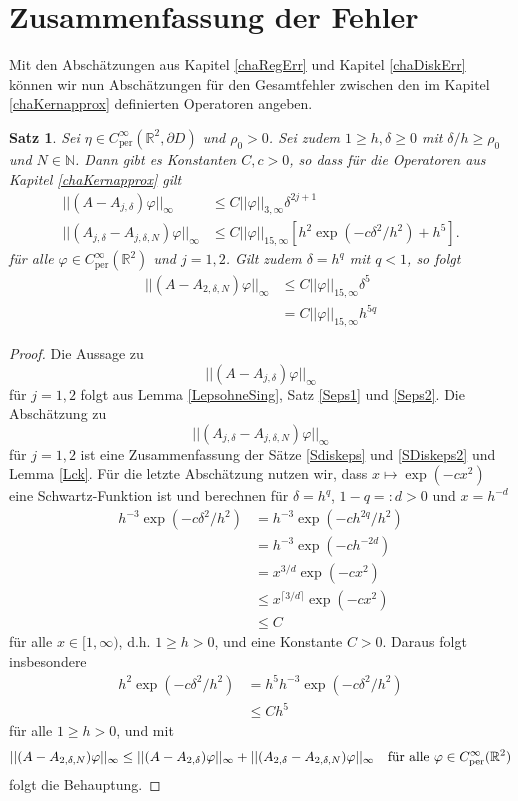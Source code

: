 \documentclass[12pt,a4paper]{scrartcl}
\newtheorem{Satz}{Satz}[section]
\numberwithin{equation}{section}
\newcommand{\R}{\mathbb{R}} %
\newcommand{\N}{\mathbb{N}} %
\newcommand{\per}{\operatorname{per}}
\newcommand{\fa}{\text{\quad für alle }}
\begin{document}
\section{Zusammenfassung der Fehler}
Mit den Abschätzungen aus Kapitel \ref{chaRegErr} und Kapitel \ref{chaDiskErr} können wir nun Abschätzungen für den Gesamtfehler zwischen den im Kapitel \ref{chaKernapprox} definierten Operatoren angeben. 
\begin{Satz}
Sei $\eta \in C_{\per}^{\infty}(\R^2,\partial D)$ und $\rho_0>0$. Sei zudem $1 \geq h,\delta \geq 0$ mit $\delta/h \geq \rho_0$ und $N \in \N$. Dann gibt es Konstanten $C,c>0$, so dass für die Operatoren aus Kapitel \ref{chaKernapprox} gilt
\begin{align*}
||(A-A_{j,\delta})\varphi||_{\infty}  &\leq C ||\varphi||_{3,\infty} \delta^{2j+1} \\
||(A_{j,\delta} - A_{j,\delta,N})\varphi||_{\infty} &\leq C||\varphi||_{15,\infty} [h^2 \exp(-c \delta^2/h^2)+h^5].
\end{align*}
für alle $\varphi \in C_{\per}^\infty(\R^2)$ und $j=1,2$. Gilt zudem $\delta = h^q$ mit $q<1$, so folgt
\begin{align*}
||(A-A_{2,\delta,N}) \varphi||_\infty &\leq C ||\varphi||_{15,\infty} \delta^5 \\
 &= C ||\varphi||_{15,\infty} h^{5q} 
\end{align*}
\end{Satz}
\begin{proof}
Die Aussage zu
\[
||(A-A_{j,\delta})\varphi||_{\infty} 
\]
für $j=1,2$ folgt aus Lemma \ref{LepsohneSing}, Satz \ref{Seps1} und \ref{Seps2}.
Die Abschätzung zu
\[
||(A_{j,\delta} - A_{j,\delta,N})\varphi||_{\infty}
\]
für $j=1,2$ ist eine Zusammenfassung der Sätze \ref{Sdiskeps} und \ref{SDiskeps2} und Lemma \ref{Lck}.
Für die letzte Abschätzung nutzen wir, dass $x \mapsto \exp(-c x^{2})$ eine Schwartz-Funktion ist und berechnen für $\delta=h^q$, $1-q=:d>0$ und $x=h^{-d}$
\begin{align*}
h^{-3} \exp(-c \delta^2/h^2) 
&= h^{-3} \exp(-c h^{2q}/h^2) \\
&= h^{-3}\exp(-c h^{-2d}) \\
&= x^{3/d}\exp(-c x^{2}) \\
& \leq x^{\lceil 3/d \rceil}\exp(-c x^{2}) \\
& \leq C
\end{align*}
für alle $x \in [1, \infty)$, d.h. $1 \geq h>0$, und eine Konstante $C>0$.
Daraus folgt insbesondere 
\begin{align*}
h^{2} \exp(-c \delta^2/h^2) 
&= h^5 h^{-3} \exp(-c \delta^2/h^2) \\
& \leq C h^5
\end{align*}
für alle $1 \geq h>0$, und mit
\[
||(A-A_{2,\delta,N}) \varphi||_\infty \leq ||(A-A_{2,\delta})\varphi||_{\infty} + ||(A_{2,\delta} - A_{2,\delta,N})\varphi||_{\infty} \fa \varphi \in C_{\per}^\infty(\R^2)
\]
folgt die Behauptung.

\end{proof}
\end{document}
